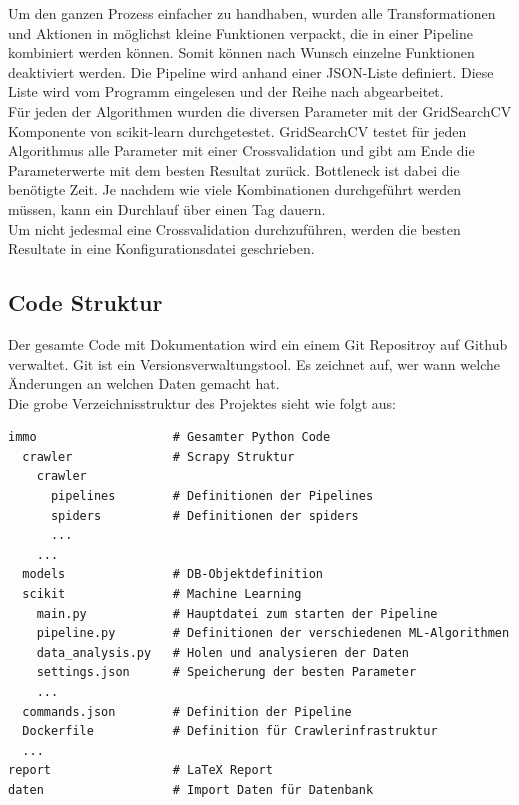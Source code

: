 Um den ganzen Prozess einfacher zu handhaben, wurden alle Transformationen und Aktionen in möglichst kleine Funktionen verpackt, die in einer Pipeline kombiniert werden können. Somit können nach Wunsch einzelne Funktionen deaktiviert werden. Die Pipeline wird anhand einer JSON-Liste definiert. Diese Liste wird vom Programm eingelesen und der Reihe nach abgearbeitet.\\[2ex]
%
Für jeden der Algorithmen wurden die diversen Parameter mit der GridSearchCV Komponente von scikit-learn durchgetestet. GridSearchCV testet für jeden Algorithmus alle Parameter mit einer Crossvalidation und gibt am Ende die Parameterwerte mit dem besten Resultat zurück. Bottleneck ist dabei die benötigte Zeit. Je nachdem wie viele Kombinationen durchgeführt werden müssen, kann ein Durchlauf über einen Tag dauern.\\
Um nicht jedesmal eine Crossvalidation durchzuführen, werden die besten Resultate in eine Konfigurationsdatei geschrieben.

\subsection{Code Struktur}
Der gesamte Code mit Dokumentation wird ein einem Git Repositroy auf Github verwaltet. Git ist ein Versionsverwaltungstool. Es zeichnet auf, wer wann welche Änderungen an welchen Daten gemacht hat.\\
Die grobe Verzeichnisstruktur des Projektes sieht wie folgt aus:
\begin{verbatim}
immo                   # Gesamter Python Code
  crawler              # Scrapy Struktur
    crawler
      pipelines        # Definitionen der Pipelines
      spiders          # Definitionen der spiders
      ...
    ...
  models               # DB-Objektdefinition
  scikit               # Machine Learning
    main.py            # Hauptdatei zum starten der Pipeline
    pipeline.py        # Definitionen der verschiedenen ML-Algorithmen
    data_analysis.py   # Holen und analysieren der Daten
    settings.json      # Speicherung der besten Parameter
    ...
  commands.json        # Definition der Pipeline
  Dockerfile           # Definition für Crawlerinfrastruktur
  ...
report                 # LaTeX Report
daten                  # Import Daten für Datenbank
\end{verbatim}
